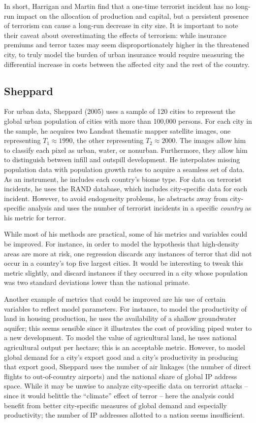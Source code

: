 \documentclass[preprint,2p,12pt]{elsarticle}
\begin{document}
In short, Harrigan and Martin find that a one-time terrorist incident has no long-run impact on the allocation of production and capital, but a persistent presence of terrorism can cause a long-run decrease in city size. It is important to note their caveat about overestimating the effects of terrorism: while insurance premiums and terror taxes may seem disproportionately higher in the threatened city, to truly model the burden of urban insurance would require measuring the differential increase in costs between the affected city and the rest of the country.

\subsection{Sheppard}
For urban data, Sheppard (2005) uses a sample of 120 cities to represent the global urban population of cities with more than 100,000 persons. For each city in the sample, he acquires two Landsat thematic mapper satellite images, one representing $T_1 \approx 1990$, the other representing $T_2 \approx 2000$. The images allow him to classify each pixel as urban, water, or nonurban. Furthermore, they allow him to distinguish between infill and outspill development. He interpolates missing population data with population growth rates to acquire a seamless set of data. As an instrument, he includes each country's biome type. For data on terrorist incidents, he uses the RAND database, which includes city-specific data for each incident. However, to avoid endogeneity problems, he abstracts away from city-specific analysis and uses the number of terrorist incidents in a specific \emph{country} as his metric for terror.

While most of his methods are practical, some of his metrics and variables could be improved. For instance, in order to model the hypothesis that high-density areas are more at risk, one regression discards any instances of terror that did not occur in a country's top five largest cities. It would be interesting to tweak this metric slightly, and discard instances if they occurred in a city whose population was two standard deviations lower than the national primate.

Another example of metrics that could be improved are his use of certain variables to reflect model parameters. For instance, to model the productivity of land in housing production, he uses the availability of a shallow groundwater aquifer; this seems sensible since it illustrates the cost of providing piped water to a new development. To model the value of agricultural land, he uses national agricultural output per hectare; this is an acceptable metric. However, to model global demand for a city's export good and a city's productivity in producing that export good, Sheppard uses the number of air linkages (the number of direct flights to out-of-country airports) and the national share of global IP address space. While it may be unwise to analyze city-specific data on terrorist attacks -- since it would belittle the ``climate'' effect of terror -- here the analysis could benefit from better city-specific measures of global demand and especially productivity; the number of IP addresses allotted to a nation seems insufficient.
\end{document}
